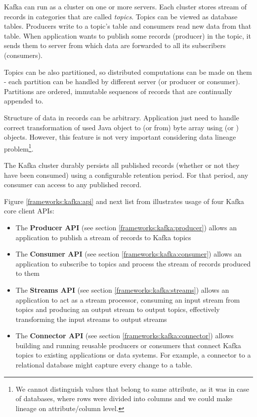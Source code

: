 Kafka can run as a cluster on one or more servers.
Each cluster stores stream of records in categories that are called \textit{topics}.
Topics can be viewed as database tables. Producers write to a topic's table
and consumers read new data from that table.
When application wants to publish some records (producer) in the topic,
it sends them to server from which data are forwarded to all its subscribers (consumers).

Topics can be also partitioned, so distributed computations can be made
on them - each partition can be handled by different server (or producer or consumer).
Partitions are ordered, immutable sequences of records that are continually appended to.

Structure of data in records can be arbitrary. Application just need to handle
correct transformation of used Java object to (or from) byte array using
 (or ) objects.
However, this feature is not very important considering data lineage problem\footnote{
  We cannot distinguish values that belong to same attribute, as it was in case
  of databases, where rows were divided into columns and we could make
  lineage on attribute/column level.
}.

The Kafka cluster durably persists all published records (whether or not they have been consumed)
using a configurable retention period. For that period, any consumer can access
to any published record.

Figure \ref{frameworks:kafka:api} and next list from \citet{Kafka}
illustrates usage of four Kafka core client APIs:
\begin{itemize}
  \item The \textbf{Producer API} (see section \ref{frameworks:kafka:producer}) allows an application to publish
    a stream of records to Kafka topics
  \item The \textbf{Consumer API} (see section \ref{frameworks:kafka:consumer}) allows an application to subscribe
    to topics and process the stream of records produced to them
  \item The \textbf{Streams API} (see section \ref{frameworks:kafka:streams}) allows an application to act as a stream processor,
    consuming an input stream from topics and producing an output stream to output topics,
    effectively transforming the input streams to output streams
  \item The \textbf{Connector API} (see section \ref{frameworks:kafka:connector}) allows building and running reusable producers or consumers
    that connect Kafka topics to existing applications or data systems.
    For example, a connector to a relational database might capture every change to a table. 
\end{itemize}

